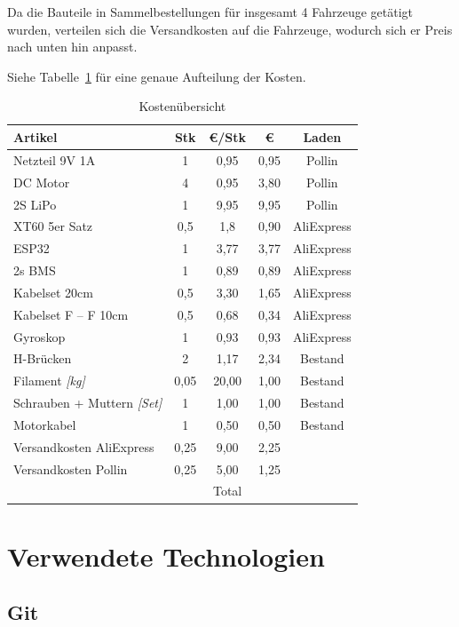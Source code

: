 Da die Bauteile in Sammelbestellungen für insgesamt 4 Fahrzeuge getätigt wurden, verteilen sich die Versandkosten auf die Fahrzeuge, wodurch sich er Preis nach unten hin anpasst. 

Siehe Tabelle~\ref{table:Kosten} für eine genaue Aufteilung der Kosten.
\begin{table}[!ht]
	\centering
\begin{tabular}{lcccc}
	Artikel & Stk & \euro/Stk & \euro{} & Laden\\
	\midrule[2pt]
	Netzteil 9V 1A & 1 & 0,95 & 0,95 & Pollin\\
	\midrule
	DC Motor & 4 & 0,95 & 3,80 & Pollin\\
	\midrule
	2S LiPo & 1 & 9,95 & 9,95 & Pollin\\
	\midrule
	XT60 5er Satz & 0,5 & 1,8 & 0,90 & AliExpress\\
	\midrule
	ESP32 & 1 & 3,77 & 3,77 & AliExpress\\
	\midrule
	2s BMS & 1 & 0,89 & 0,89 & AliExpress\\
	\midrule
	Kabelset 20cm & 0,5 & 3,30 & 1,65 & AliExpress\\
	\midrule
	Kabelset F -- F 10cm & 0,5 & 0,68 & 0,34 & AliExpress\\
	\midrule
	Gyroskop & 1 & 0,93 & 0,93 & AliExpress\\
	\midrule
	H-Brücken & 2 & 1,17 & 2,34 & Bestand\\
	\midrule
	Filament \textit{[kg]} & 0,05 & 20,00 & 1,00 & Bestand\\
	\midrule
	Schrauben + Muttern \textit{[Set]} & 1 & 1,00 & 1,00 & Bestand\\
	\midrule
	Motorkabel & 1 & 0,50 & 0,50 & Bestand\\
	\midrule
	Versandkosten AliExpress & 0,25 & 9,00 & 2,25 & \\
	\midrule
	Versandkosten Pollin & 0,25 & 5,00 & 1,25 & \\
	\midrule
	\midrule
	 &  & Total & \EUR{31,52} & \\
\end{tabular} 
\caption{Kostenübersicht} 
\label{table:Kosten}
\end{table} 

\section{Verwendete Technologien}

\subsection{Git}

